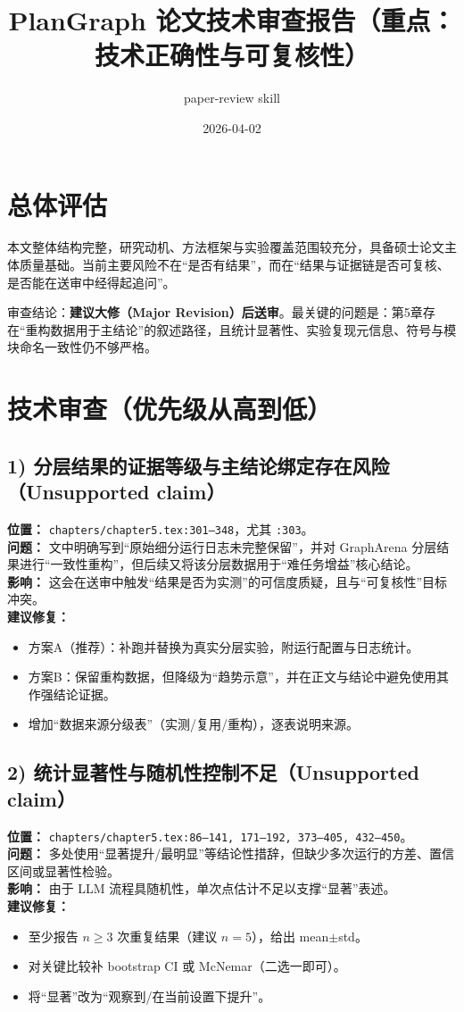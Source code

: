 \documentclass[12pt]{ctexart}
\title{PlanGraph 论文技术审查报告（重点：技术正确性与可复核性）}
\author{paper-review skill}
\date{2026-04-02}
\begin{document}
\maketitle

\section*{总体评估}
本文整体结构完整，研究动机、方法框架与实验覆盖范围较充分，具备硕士论文主体质量基础。当前主要风险不在“是否有结果”，而在“结果与证据链是否可复核、是否能在送审中经得起追问”。

审查结论：\textbf{建议大修（Major Revision）后送审}。最关键的问题是：第5章存在“重构数据用于主结论”的叙述路径，且统计显著性、实验复现元信息、符号与模块命名一致性仍不够严格。

\section*{技术审查（优先级从高到低）}

\subsection*{1) 分层结果的证据等级与主结论绑定存在风险（Unsupported claim）}
\textbf{位置：} \texttt{chapters/chapter5.tex:301--348}，尤其 \texttt{:303}。\\
\textbf{问题：} 文中明确写到“原始细分运行日志未完整保留”，并对 GraphArena 分层结果进行“一致性重构”，但后续又将该分层数据用于“难任务增益”核心结论。\\
\textbf{影响：} 这会在送审中触发“结果是否为实测”的可信度质疑，且与“可复核性”目标冲突。\\
\textbf{建议修复：}
\begin{itemize}
  \item 方案A（推荐）：补跑并替换为真实分层实验，附运行配置与日志统计。
  \item 方案B：保留重构数据，但降级为“趋势示意”，并在正文与结论中避免使用其作强结论证据。
  \item 增加“数据来源分级表”（实测/复用/重构），逐表说明来源。
\end{itemize}

\subsection*{2) 统计显著性与随机性控制不足（Unsupported claim）}
\textbf{位置：} \texttt{chapters/chapter5.tex:86--141, 171--192, 373--405, 432--450}。\\
\textbf{问题：} 多处使用“显著提升/最明显”等结论性措辞，但缺少多次运行的方差、置信区间或显著性检验。\\
\textbf{影响：} 由于 LLM 流程具随机性，单次点估计不足以支撑“显著”表述。\\
\textbf{建议修复：}
\begin{itemize}
  \item 至少报告 \(n\ge 3\) 次重复结果（建议 \(n=5\)），给出 mean$\pm$std。
  \item 对关键比较补 bootstrap CI 或 McNemar（二选一即可）。
  \item 将“显著”改为“观察到/在当前设置下提升”。
\end{itemize}
\end{document}
